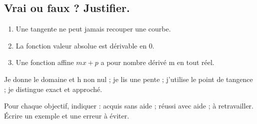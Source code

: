 \subsection*{Vrai ou faux ? Justifier.}\label{C04-VF}
\begin{enumerate}
\item Une tangente ne peut jamais recouper une courbe.
\item La fonction valeur absolue est dérivable en 0.
\item Une fonction affine $mx+p$ a pour nombre dérivé m en tout réel.
\end{enumerate}
\begin{keypoint}Je donne le domaine et h non nul ; je lis une pente ; j’utilise le point de tangence ; je distingue exact et approché.

Pour chaque objectif, indiquer : acquis sans aide ; réussi avec aide ; à retravailler. Écrire un exemple et une erreur à éviter.\end{keypoint}
\endgroup
\ifmxteacher{}\fi
